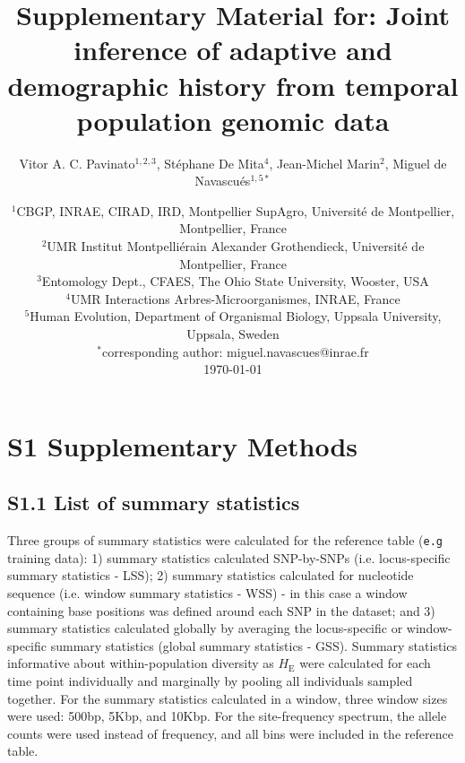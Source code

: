 \documentclass[a4paper, 12pt]{article}
\title{Supplementary Material for: Joint inference of adaptive and demographic history from temporal population genomic data}
\author{\small
            Vitor A. C. Pavinato$^{1,2,3}$, Stéphane De Mita$^4$, Jean-Michel Marin$^2$, Miguel de Navascués$^{1,5*}$}
\date{{\footnotesize %
    $^1$CBGP, INRAE, CIRAD, IRD, Montpellier SupAgro, Université de Montpellier, Montpellier, France\\%
    $^2$UMR Institut Montpelliérain Alexander Grothendieck, Université de Montpellier, France\\%
    $^3$Entomology Dept., CFAES, The Ohio State University, Wooster, USA\\%
    $^4$UMR Interactions Arbres-Microorganismes, INRAE, France \\%
    $^5$Human Evolution, Department of Organismal Biology, Uppsala University, Uppsala, Sweden\\%
    $^*$corresponding author: miguel.navascues@inrae.fr\\[2ex]%
    }
    \footnotesize\today    
}
\begin{document}
\maketitle




\newpage


\section*{S1 Supplementary Methods}

\subsection*{S1.1 List of summary statistics}

Three groups of summary statistics were calculated for the reference table (\texttt{e.g} training data): 1) summary statistics calculated SNP-by-SNPs (i.e. locus-specific summary statistics - LSS); 2) summary statistics calculated for nucleotide sequence (i.e. window summary statistics - WSS) - in this case a window containing base positions was defined around each SNP in the dataset; and 3) summary statistics calculated globally by averaging the locus-specific or window-specific summary statistics (global summary statistics - GSS). Summary statistics informative about within-population diversity as $H_{\mathrm{E}}$ were calculated for each time point individually and marginally by pooling all individuals sampled together. For the summary statistics calculated in a window, three window sizes were used: 500bp, 5Kbp, and 10Kbp. For the site-frequency spectrum, the allele counts were used instead of frequency, and all bins were included in the reference table.
\end{document}
